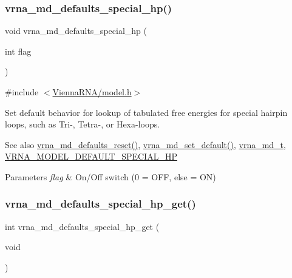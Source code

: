 \subsubsection{\texorpdfstring{vrna\+\_\+md\+\_\+defaults\+\_\+special\+\_\+hp()}{vrna\_md\_defaults\_special\_hp()}}
{\footnotesize\ttfamily void vrna\+\_\+md\+\_\+defaults\+\_\+special\+\_\+hp (\begin{DoxyParamCaption}\item[{int}]{flag }\end{DoxyParamCaption})}



{\ttfamily \#include $<$\hyperlink{model_8h}{Vienna\+R\+N\+A/model.\+h}$>$}



Set default behavior for lookup of tabulated free energies for special hairpin loops, such as Tri-\/, Tetra-\/, or Hexa-\/loops. 

\begin{DoxySeeAlso}{See also}
\hyperlink{group__model__details_ga70834424cf804d149937de89f80ceb45}{vrna\+\_\+md\+\_\+defaults\+\_\+reset()}, \hyperlink{group__model__details_ga8ac6ff84936282436f822644bf841f66}{vrna\+\_\+md\+\_\+set\+\_\+default()}, \hyperlink{group__model__details_ga1f8a10e12a0a1915f2a4eff0b28ea17c}{vrna\+\_\+md\+\_\+t}, \hyperlink{group__model__details_gabd1ab224e1048defd45c165ed7d1c108}{V\+R\+N\+A\+\_\+\+M\+O\+D\+E\+L\+\_\+\+D\+E\+F\+A\+U\+L\+T\+\_\+\+S\+P\+E\+C\+I\+A\+L\+\_\+\+HP} 
\end{DoxySeeAlso}

\begin{DoxyParams}{Parameters}
{\em flag} & On/\+Off switch (0 = O\+FF, else = ON) \\
\hline
\end{DoxyParams}
\mbox{\label{group__model__details_ga1d68a6efdaa1253cc63fd9cd06452559}} 
\subsubsection{\texorpdfstring{vrna\+\_\+md\+\_\+defaults\+\_\+special\+\_\+hp\+\_\+get()}{vrna\_md\_defaults\_special\_hp\_get()}}
{\footnotesize\ttfamily int vrna\+\_\+md\+\_\+defaults\+\_\+special\+\_\+hp\+\_\+get (\begin{DoxyParamCaption}\item[{void}]{ }\end{DoxyParamCaption})}



